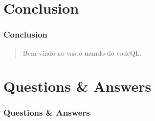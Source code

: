 \documentclass[10pt, aspectratio=169]{beamer}
\begin{document}
\section{Conclusion}
\begin{frame}
  \frametitle{Conclusion}
  	\begin{quotation}
  	Bem-vindo ao vasto mundo do codeQL. 
  \end{quotation}
  
 \end{frame}


\section{Questions \& Answers}
\begin{frame}
  \frametitle{Questions \& Answers}

  \begin{quotation}
  \end{quotation}
  \flushright

\end{frame}
\end{document}
